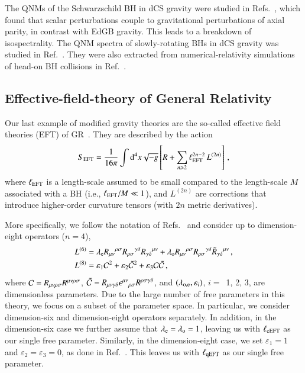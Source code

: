 \documentclass[twocolumn,
               prd,
               aps,
               superscriptaddress,
               tightenlines,
               nofootinbib,
               eqsecnum,
               amsfonts,
               amsmath,
               longbibliography]{revtex4-1}
\newcommand\redsout{\bgroup\markoverwith{\textcolor{red}{\rule[0.5ex]{8pt}{1pt}}}\ULon} %
\newcommand{\dd}{{\rm d}}
\newcommand{\lame}{\lambda_{\rm e}}
\newcommand{\lamo}{\lambda_{\rm o}}
\begin{document}
The QNMs of the Schwarzschild BH in dCS gravity were studied in
Refs.~\cite{Yunes:2007ss,Cardoso:2009pk,Molina:2010fb}, which found that scalar
perturbations couple to gravitational perturbations of axial parity, in contrast
with EdGB gravity.
%
This leads to a breakdown of isospectrality. The QNM spectra of slowly-rotating BHs in dCS gravity was
studied in Ref.~\cite{Srivastava:2021imr,Wagle:2021tam}.
%
They were also extracted from numerical-relativity simulations of head-on BH collisions
in Ref.~\cite{Okounkova:2019dfo}.

\subsection{Effective-field-theory of General Relativity}

Our last example of modified gravity theories are the so-called effective field
theories (EFT) of GR~\cite{Endlich:2017tqa,Sennett:2019bpc,deRham:2020ejn,Cano:2020cao,Cano:2021myl}.
%
They are described by the action
%
\begin{equation} \label{eq:action_eft}
    S_{\rm EFT} = \frac{1}{16 \pi}
    \int \dd^4x \sqrt{-g}
    \left[ R
    +
    \sum_{n \geqslant 2} \ell_{\rm EFT}^{2n - 2}\, L^{(2n)}
    \right]\,,
\end{equation}
%
where $\ell_{\rm EFT}$ is a length-scale assumed to be small compared to the length-scale $M$
associated with a BH (i.e., $\ell_{\rm EFT} / M \ll 1$), and $L^{(2n)}$ are corrections
that introduce higher-order curvature tensors (with $2n$ metric derivatives).

More specifically, we follow the notation of
Refs.~\cite{Cano:2020cao,Cano:2021myl} and consider up to dimension-eight
operators ($n=4$),
%
\begin{subequations}
\label{eq:action_mods}
\begin{align}
    L^{(6)} &= \lame R_{\mu\nu}{}^{\rho\sigma} R_{\rho\sigma}{}^{\gamma\delta} R_{\gamma \delta}{}^{\mu\nu}
    + \lamo R_{\mu\nu}{}^{\rho\sigma} R_{\rho\sigma}{}^{\gamma\delta} \tilde{R}_{\gamma \delta}{}^{\mu\nu}\,,
    \label{eq:s_6}
    \\
    L^{(8)} &= \varepsilon_{1} \mathcal{C}^2
    + \varepsilon_{2} \tilde{\mathcal{C}}^{2}
    + \varepsilon_{3} \mathcal{C} \tilde{\mathcal{C}}\,,
\label{eq:s_8}
\end{align}
\end{subequations}
%
where ${\cal C} = R_{\mu\nu\rho\sigma} R^{\mu\nu\rho\sigma}$,
$\tilde{\cal C} = R_{\mu\nu\gamma\delta} \epsilon^{\mu\nu}{}_{\rho\sigma} R^{\rho\sigma\gamma\delta}$,
and $(\lambda_{\rm o, e},\varepsilon_{i})$, $i=$~1, 2, 3, are dimensionless parameters.
%
Due to the large number of free parameters in this theory, we focus on a subset of the parameter space.
%
In particular, we consider dimension-six and dimension-eight operators separately.
%
In addition, in the dimension-six case we further assume that $\lame = \lamo = 1$,
leaving us with \redsout{$\ell =$} $\ell_{\rm cEFT}$ as our single free parameter.
%
Similarly, in the dimension-eight case, we set $\varepsilon_{1} = 1$ and $\varepsilon_{2} = \varepsilon_{3} = 0$,
as done in Ref.~\cite{Sennett:2019bpc}.
%
This leaves us with \redsout{$\ell =$} $\ell_{\rm qEFT}$ as our single free parameter.
\end{document}
